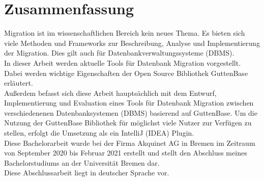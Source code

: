\section*{Zusammenfassung}

Migration ist im wissenschaftlichen Bereich kein neues Thema. Es bieten sich viele Methoden und Frameworks zur Beschreibung, Analyse und Implementierung der Migration. Dies gilt auch für Datenbankverwaltungssysteme (DBMS). \\ 
In dieser Arbeit werden aktuelle Tools für Datenbank Migration vorgestellt. Dabei werden wichtige Eigenschaften der Open Source Bibliothek GuttenBase erläutert.\\
Außerdem befasst sich diese Arbeit hauptsächlich mit dem Entwurf, Implementierung und Evaluation eines Tools für Datenbank Migration zwischen verschiedenenen Datenbanksystemen (DBMS) basierend auf GuttenBase.
Um die Nutzung der GuttenBase Bibliothek für möglichst viele Nutzer zur Verfügen zu stellen, erfolgt die Umsetzung als ein IntelliJ (IDEA) Plugin.\\ 
Diese Bachelorarbeit wurde bei der Firma Akquinet AG in Bremen im Zeitraum von September 2020 bis Februar 2021 erstellt und stellt den Abschluss meines Bachelorstudiums an der Universität Bremen dar. \\ 
Diese Abschlussarbeit liegt in deutscher Sprache vor.





